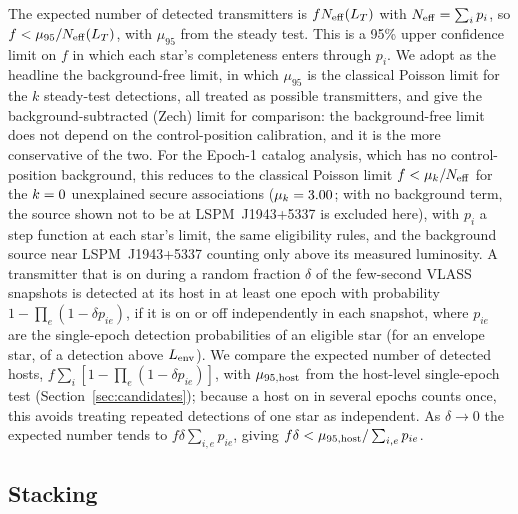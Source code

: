\documentclass[linenumbers]{aastex702}
\begin{document}
The expected number of detected transmitters is $fN_{\rm eff}(L_T)$ with $N_{\rm eff}=\sum_ip_i$, so $f<\mu_{95}/N_{\rm eff}(L_T)$, with $\mu_{95}$ from the steady test. This is a 95\% upper confidence limit on $f$ in which each star's completeness enters through $p_i$. We adopt as the headline the background-free limit, in which $\mu_{95}$ is the classical Poisson limit for the $k$ steady-test detections, all treated as possible transmitters, and give the background-subtracted (Zech) limit for comparison: the background-free limit does not depend on the control-position calibration, and it is the more conservative of the two. For the Epoch-1 catalog analysis, which has no control-position background, this reduces to the classical Poisson limit $f<\mu_k/N_{\rm eff}$ for the $k=0$ unexplained secure associations ($\mu_k=3.00$; with no background term, the source shown not to be at LSPM~J1943+5337 is excluded here), with $p_i$ a step function at each star's limit, the same eligibility rules, and the background source near LSPM~J1943+5337 counting only above its measured luminosity. A transmitter that is on during a random fraction $\delta$ of the few-second VLASS snapshots is detected at its host in at least one epoch with probability $1-\prod_e(1-\delta p_{ie})$, if it is on or off independently in each snapshot, where $p_{ie}$ are the single-epoch detection probabilities of an eligible star (for an envelope star, of a detection above $L_{\rm env}$). We compare the expected number of detected hosts, $f\sum_i[1-\prod_e(1-\delta p_{ie})]$, with $\mu_{95,{\rm host}}$ from the host-level single-epoch test (Section~\ref{sec:candidates}); because a host on in several epochs counts once, this avoids treating repeated detections of one star as independent. As $\delta\to0$ the expected number tends to $f\delta\sum_{i,e}p_{ie}$, giving $f\delta<\mu_{95,{\rm host}}/\sum_{i,e}p_{ie}$.

\subsection{Stacking} \label{sec:stack_method}
\end{document}
